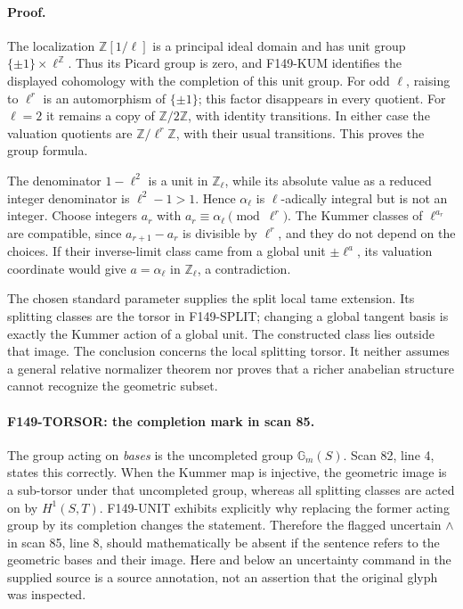\documentclass[11pt,a4paper]{article}
\theoremstyle{definition}
\begin{document}
\paragraph{Proof.}
The localization \(\mathbb Z[1/\ell]\) is a principal ideal domain and
has unit group \(\{\pm1\}\times\ell^{\mathbb Z}\).  Thus its Picard group
is zero, and F149-KUM identifies the displayed cohomology with the
completion of this unit group.  For odd \(\ell\), raising to
\(\ell^r\) is an automorphism of \(\{\pm1\}\); this factor disappears
in every quotient.  For \(\ell=2\) it remains a copy of
\(\mathbb Z/2\mathbb Z\), with identity transitions.  In either case
the valuation quotients are \(\mathbb Z/\ell^r\mathbb Z\), with their
usual transitions.  This proves the group formula.

The denominator \(1-\ell^2\) is a unit in \(\mathbb Z_\ell\), while
its absolute value as a reduced integer denominator is
\(\ell^2-1>1\).  Hence \(\alpha_\ell\) is \(\ell\)-adically integral
but is not an integer.  Choose integers \(a_r\) with
\(a_r\equiv\alpha_\ell\pmod{\ell^r}\).  The Kummer classes of
\(\ell^{a_r}\) are compatible, since
\(a_{r+1}-a_r\) is divisible by \(\ell^r\), and they do not depend
on the choices.  If their inverse-limit class came from a global
unit \(\pm\ell^a\), its valuation coordinate would give
\(a=\alpha_\ell\) in \(\mathbb Z_\ell\), a contradiction.

The chosen standard parameter supplies the split local tame extension.
Its splitting classes are the torsor in F149-SPLIT; changing a global
tangent basis is exactly the Kummer action of a global unit.  The
constructed class lies outside that image.  The conclusion concerns
the local splitting torsor.  It neither assumes a general relative
normalizer theorem nor proves that a richer anabelian structure cannot
recognize the geometric subset.

\paragraph{F149-TORSOR: the completion mark in scan 85.}
The group acting on \emph{bases} is the uncompleted group
\(\mathbb G_m(S)\).  Scan 82, line 4, states this correctly.  When the
Kummer map is injective, the geometric image is a sub-torsor under
that uncompleted group, whereas all splitting classes are acted on by
\(H^1(S,T)\).  F149-UNIT exhibits explicitly why replacing the former
acting group by its completion changes the statement.  Therefore the
flagged uncertain \(\wedge\) in scan 85, line 8, should mathematically
be absent if the sentence refers to the geometric bases and their
image.  Here and below an uncertainty command in the supplied source
is a source annotation, not an assertion that the original glyph was
inspected.
\end{document}
